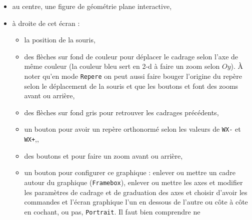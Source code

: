 \documentclass[a4paper,11pt]{article}
\begin{document}
\begin{itemize}
\begin{itemize}
valide la ligne et les lignes suivantes. 
\item une case {\tt Landscape} \`a cocher si on veut avoir un \'ecran de 
g\'eom\'etrie plus grand : les lignes de commandes sont alors d\'eplac\'ees en 
dessous de l'\'ecran.
 \item une case \framebox{$\sim$} \`a cocher (resp d\'ecocher) si on veut avoir
des points \`a coordonn\'ees d\'ecimales (resp exactes) en cliquant \`a la 
souris, voir aussi \ref{sec:sim}).
\item une ligne vide qui ne deviendra un bouton  
qu'apr\`es une sauvegarde du niveau de g\'eom\'etrie (cette sauvegarde est la 
sauvegarde des lignes de commandes qui sont \`a gauche de la figure
et se fait par exemple sous le nom {\tt dessin.cas}. On peut aussi r\'ealiser 
cette sauvegarde avec 
{\tt Fig $\blacktriangleright$Sauver lignes de commande}) ce qui a aussi
pour effet de sauver les commandes qui sont \`a gauche de la figure.
\end{itemize}
\item au centre, une figure de g\'eom\'etrie plane interactive,
\item \`a droite de cet \'ecran : 
\begin{itemize}
\item la position de la souris,
\item des fl\`eches sur fond de couleur pour d\'eplacer le cadrage selon l'axe 
de m\^eme couleur (la couleur bleu sert en 2-d
\`a faire un zoom selon $Oy$). \`A noter qu'en mode {\tt Repere} on peut aussi 
faire bouger l'origine du rep\`ere selon le 
d\'eplacement de la souris et que les boutons  et  font des zooms avant ou arri\`ere,
\item des fl\`eches sur fond gris pour retrouver
les cadrages pr\'ec\'edents, 
\item un bouton \framebox{$\perp$} pour avoir un rep\`ere orthonorm\'e
selon les valeurs de {\tt WX-} et {\tt WX+},,
\item des boutons  et  pour faire un zoom 
avant ou arri\`ere,
\item un bouton  pour configurer ce graphique : enlever ou 
mettre un cadre autour du graphique ({\tt Framebox}), enlever ou 
mettre les axes et modifier les param\`etres de cadrage et de graduation des 
axes et choisir d'avoir les commandes et l'\'ecran graphique l'un en dessous 
de l'autre ou c\^ote \`a c\^ote en cochant, ou pas, 
{\tt Portrait}. Il faut bien comprendre  ne 

\end{itemize}
\end{itemize}
\end{document}
